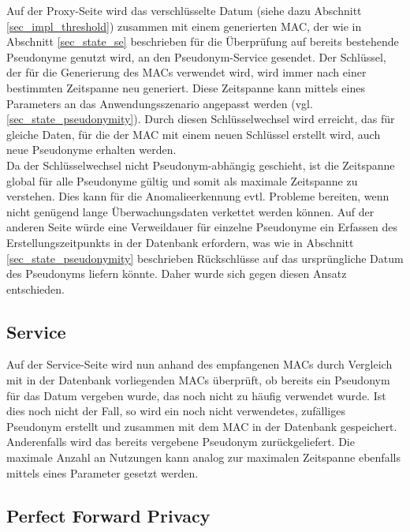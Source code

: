 Auf der Proxy-Seite wird das verschlüsselte Datum (siehe dazu Abschnitt \ref{sec_impl_threshold}) zusammen mit einem generierten MAC, der wie in Abschnitt \ref{sec_state_se} beschrieben für die Überprüfung auf bereits bestehende Pseudonyme genutzt wird, an den Pseudonym-Service gesendet. 
Der Schlüssel, der für die Generierung des MACs verwendet wird, wird immer nach einer bestimmten Zeitspanne neu generiert. Diese Zeitspanne kann mittels eines Parameters an das Anwendungsszenario angepasst werden (vgl. \ref{sec_state_pseudonymity}). Durch diesen Schlüsselwechsel wird erreicht, das für gleiche Daten, für die der MAC mit einem neuen Schlüssel erstellt wird, auch neue Pseudonyme erhalten werden. \\
Da der Schlüsselwechsel nicht Pseudonym-abhängig geschieht, ist die Zeitspanne global für alle Pseudonyme gültig und somit als maximale Zeitspanne zu verstehen. Dies kann für die Anomalieerkennung evtl. Probleme bereiten, wenn nicht genügend lange Überwachungsdaten verkettet werden können. Auf der anderen Seite würde eine Verweildauer für einzelne Pseudonyme ein Erfassen des Erstellungszeitpunkts in der Datenbank erfordern, was wie in Abschnitt \ref{sec_state_pseudonymity} beschrieben Rückschlüsse auf das ursprüngliche Datum des Pseudonyms liefern könnte. Daher wurde sich gegen diesen Ansatz entschieden.

\subsection{Service}

Auf der Service-Seite wird nun anhand des empfangenen MACs durch Vergleich mit in der Datenbank vorliegenden MACs überprüft, ob bereits ein Pseudonym für das Datum vergeben wurde, das noch nicht zu häufig verwendet wurde. Ist dies noch nicht der Fall, so wird ein noch nicht verwendetes, zufälliges Pseudonym erstellt und zusammen mit dem MAC in der Datenbank gespeichert. Anderenfalls wird das bereits vergebene Pseudonym zurückgeliefert. Die maximale Anzahl an Nutzungen kann analog zur maximalen Zeitspanne ebenfalls mittels eines Parameter gesetzt werden. 

\subsection{Perfect Forward Privacy}

